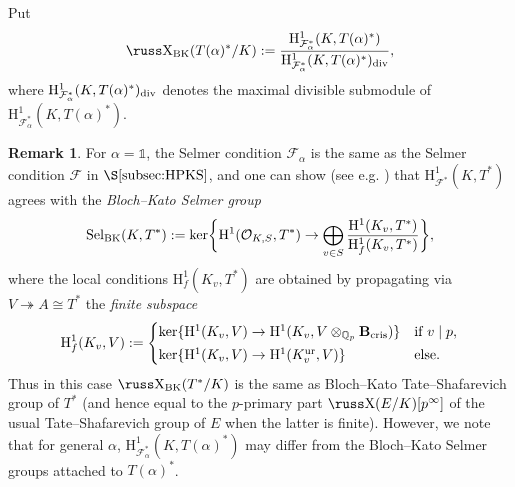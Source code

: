 \documentclass[10pt,reqno]{amsart}
\numberwithin{equation}{section}
\theoremstyle{plain}
\theoremstyle{definition}
\newtheorem{rem}[thm]{Remark}
\theoremstyle{definition}
\theoremstyle{plain}
\theoremstyle{plain}
\theoremstyle{plain}
\theoremstyle{plain}
\theoremstyle{plain}
\theoremstyle{plain}
\newcommand{\Z}{\mathbb{Z}}
\newcommand{\Q}{\mathbb{Q}}
\def\sha{\hbox{\russ\char88}}
\newcommand{\Fcal}{\mathcal{F}}
\newcommand{\rH}{\mathrm{H}}
\begin{document}
Put
\begin{equation}\label{eq:def-sha}
\sha_{\rm BK}(T(\alpha)^*/K):=\frac{\rH^1_{\Fcal_\alpha^*}(K,T(\alpha)^*)}{\rH^1_{\Fcal_\alpha^*}(K,T(\alpha)^*)_{\rm div}},\nonumber
\end{equation}
where $\rH^1_{\Fcal_\alpha^*}(K,T(\alpha)^*)_{\rm div}$ denotes the maximal divisible submodule of $\rH^1_{\Fcal_\alpha^*}(K,T(\alpha)^*)$. 

\begin{rem}
For $\alpha=\mathds{1}$, the Selmer condition $\Fcal_\alpha$ is the same as the Selmer condition $\Fcal$ in $\S\ref{subsec:HPKS}$, and one can show (see e.g. \cite{flach-CT}) that $\rH^1_{\Fcal^*}(K,T^*)$ agrees with the \emph{Bloch--Kato Selmer group}
\[
{\rm Sel}_{\rm BK}(K,T^*):={\rm ker}\biggl\{\rH^1(\mathcal{O}_{K,S},T^*)\rightarrow\bigoplus_{v\in S}\frac{\rH^1(K_v,T^*)}{\rH^1_f(K_v,T^*)}\biggr\},
\]
where the local conditions $\rH^1_f(K_v,T^*)$ are obtained by propagating via $V\twoheadrightarrow A\cong T^*$ the \emph{finite subspace}
\[
\rH^1_f(K_v,V):=
\begin{cases}
{\rm ker}\{\rH^1(K_v,V)\rightarrow \rH^1(K_v,V\otimes_{\Q_p}\mathbf{B}_{\rm cris})\}&\textrm{if $v\mid p$},\\[0.2em]
{\rm ker}\{\rH^1(K_v,V)\rightarrow \rH^1(K_v^{\rm ur},V)\}&\textrm{else.}
\end{cases}
\]
Thus in this case $\sha_{\rm BK}(T^*/K)$ %
is the same as Bloch--Kato Tate--Shafarevich group of $T^*$ (and hence equal to the $p$-primary part $\sha(E/K)[p^\infty]$ of the usual Tate--Shafarevich group of $E$ when the latter is finite). However, we note that for general $\alpha$, $\rH^1_{\Fcal_\alpha^*}(K,T(\alpha)^*)$ may differ from the Bloch--Kato Selmer groups attached to $T(\alpha)^*$.
\end{rem}
\end{document}
